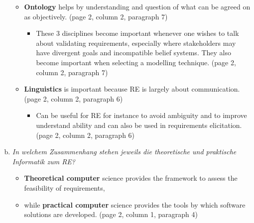 \begin{enumerate}[a)]
\begin{itemize}
        \item \textbf{Ontology} helps by understanding and question of what can be agreed on as objectively. (page 2, column 2, paragraph 7)
        \begin{itemize}
            \item These 3 disciplines become important whenever one wishes to talk about validating requirements, especially where stakeholders may have divergent goals and incompatible belief systems. They also become important when selecting a modelling technique. (page 2, column 2, paragraph 7)
        \end{itemize}
        \item \textbf{Linguistics} is important because RE is largely about communication. (page 2, column 2, paragraph 6)
        \begin{itemize}
            \item Can be useful for RE for instance to avoid ambiguity and to improve  understand ability and can also be used in requirements elicitation. (page 2, column 2, paragraph 6)
        \end{itemize}
     
    \end{itemize}
    
    \item {\itshape In welchem Zusammenhang stehen jeweils die theoretische und praktische Informatik zum RE?}
    \begin{itemize}
        \item \textbf{Theoretical computer} science provides the framework to assess the feasibility of requirements, 
        \item while \textbf{practical computer} science provides the tools by which software solutions are developed. (page 2, column 1, paragraph 4)
    \end{itemize}
    

\end{enumerate}
